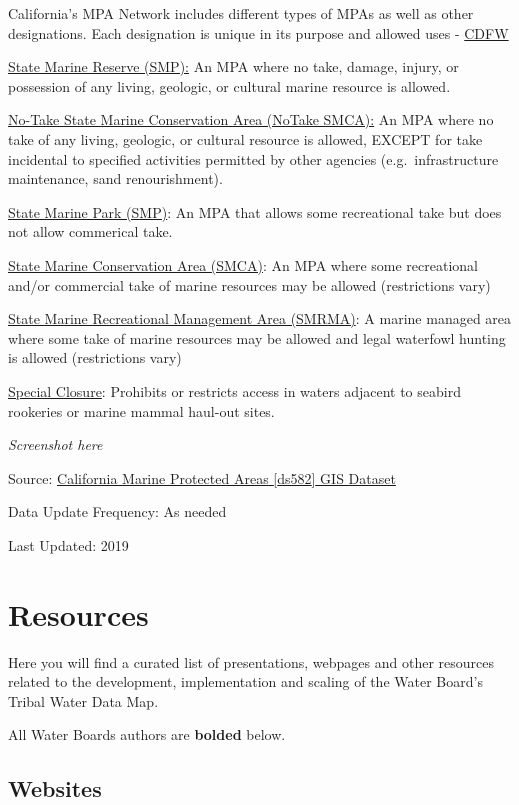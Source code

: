 \documentclass[
  letterpaper,
  DIV=11,
  numbers=noendperiod]{scrreprt}
\begin{document}
California's MPA Network includes different types of MPAs as well as
other designations. Each designation is unique in its purpose and
allowed uses -
\href{https://wildlife.ca.gov/Conservation/Marine/MPAs/About}{CDFW}

\ul{State Marine Reserve (SMP):} An MPA where no take, damage, injury,
or possession of any living, geologic, or cultural marine resource is
allowed.

\ul{No-Take State Marine Conservation Area (NoTake SMCA):} An MPA where
no take of any living, geologic, or cultural resource is allowed, EXCEPT
for take incidental to specified activities permitted by other agencies
(e.g.~infrastructure maintenance, sand renourishment).

\ul{State Marine Park (SMP)}: An MPA that allows some recreational take
but does not allow commerical take.

\ul{State Marine Conservation Area (SMCA)}: An MPA where some
recreational and/or commercial take of marine resources may be allowed
(restrictions vary)

\ul{State Marine Recreational Management Area (SMRMA)}: A marine managed
area where some take of marine resources may be allowed and legal
waterfowl hunting is allowed (restrictions vary)

\ul{Special Closure}: Prohibits or restricts access in waters adjacent
to seabird rookeries or marine mammal haul-out sites.

\emph{Screenshot here}

Source: \href{https://map.dfg.ca.gov/metadata/ds0582.html}{California
Marine Protected Areas {[}ds582{]} GIS Dataset}

Data Update Frequency: As needed

Last Updated: 2019


\chapter{Resources}\label{resources}

Here you will find a curated list of presentations, webpages and other
resources related to the development, implementation and scaling of the
Water Board's Tribal Water Data Map.

All Water Boards authors are \textbf{bolded} below.

\section{Websites}\label{websites}
\end{document}
